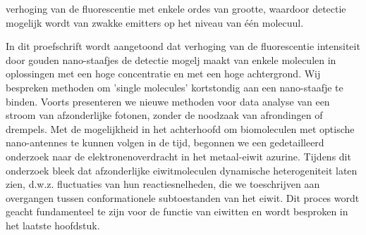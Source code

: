 verhoging van de fluorescentie met enkele ordes van grootte, waardoor detectie mogelijk wordt van zwakke emitters op het niveau van één molecuul. 


In dit proefschrift wordt aangetoond dat verhoging van de fluorescentie intensiteit door gouden nano-staafjes de detectie mogelj maakt van enkele moleculen in oplossingen met een hoge concentratie en met een hoge achtergrond. Wij bespreken methoden om ’single molecules’ kortstondig aan een nano-staafje te binden. Voorts presenteren we nieuwe methoden voor data analyse van een stroom van afzonderlijke fotonen, zonder de noodzaak van afrondingen of drempels. Met de mogelijkheid in het achterhoofd om biomoleculen met optische nano-antennes te kunnen volgen in de tijd, begonnen we een gedetailleerd onderzoek naar de elektronenoverdracht in het metaal-eiwit azurine. Tijdens dit onderzoek bleek dat afzonderlijke eiwitmoleculen dynamische heterogeniteit laten zien, d.w.z. fluctuaties van hun reactiesnelheden, die we toeschrijven aan overgangen tussen conformationele subtoestanden van het eiwit. Dit proces wordt geacht fundamenteel te zijn voor de functie van eiwitten en wordt besproken in het laatste hoofdstuk.


